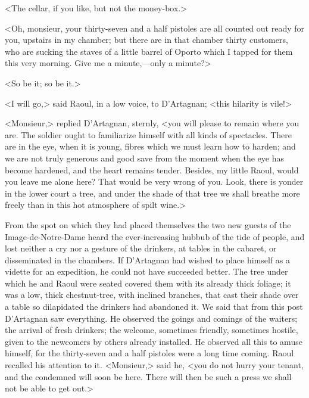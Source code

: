 <The cellar, if you like, but not the money-box.>

<Oh, monsieur, your thirty-seven and a half pistoles are all counted out ready for you, upstairs in my chamber; but there are in that chamber thirty customers, who are sucking the staves of a little barrel of Oporto which I tapped for them this very morning. Give me a minute,—only a minute?>

<So be it; so be it.>

<I will go,> said Raoul, in a low voice, to D'Artagnan; <this hilarity is vile!>

<Monsieur,> replied D'Artagnan, sternly, <you will please to remain where you are. The soldier ought to familiarize himself with all kinds of spectacles. There are in the eye, when it is young, fibres which we must learn how to harden; and we are not truly generous and good save from the moment when the eye has become hardened, and the heart remains tender. Besides, my little Raoul, would you leave me alone here? That would be very wrong of you. Look, there is yonder in the lower court a tree, and under the shade of that tree we shall breathe more freely than in this hot atmosphere of spilt wine.>

From the spot on which they had placed themselves the two new guests of the Image-de-Notre-Dame heard the ever-increasing hubbub of the tide of people, and lost neither a cry nor a gesture of the drinkers, at tables in the cabaret, or disseminated in the chambers. If D'Artagnan had wished to place himself as a vidette for an expedition, he could not have succeeded better. The tree under which he and Raoul were seated covered them with its already thick foliage; it was a low, thick chestnut-tree, with inclined branches, that cast their shade over a table so dilapidated the drinkers had abandoned it. We said that from this post D'Artagnan saw everything. He observed the goings and comings of the waiters; the arrival of fresh drinkers; the welcome, sometimes friendly, sometimes hostile, given to the newcomers by others already installed. He observed all this to amuse himself, for the thirty-seven and a half pistoles were a long time coming. Raoul recalled his attention to it. <Monsieur,> said he, <you do not hurry your tenant, and the condemned will soon be here. There will then be such a press we shall not be able to get out.>

